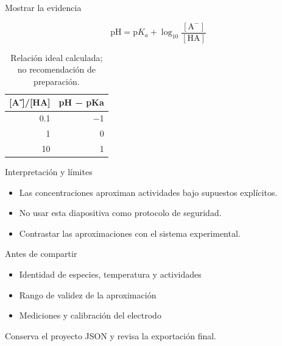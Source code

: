 \documentclass[aspectratio=169,11pt]{beamer}
\begin{document}
\begin{frame}{Mostrar la evidencia}
  \transdissolve[duration=0.25]
  \begin{center}
  \end{center}
  \medskip

  \begin{equation*}
    \mathrm{pH}=\mathrm{p}K_a+\log_{10}\frac{[\mathrm{A}^{-}]}{[\mathrm{HA}]}
  \end{equation*}
  \medskip

  \begin{table}
    \centering
    \caption{Relación ideal calculada; no recomendación de preparación.}
    \begin{tabular}{rr}
      \toprule
      \textbf{[A⁻]/[HA]} & \textbf{pH − pKa} \\
      \midrule
      0.1 & −1 \\
      1 & 0 \\
      10 & 1 \\
      \bottomrule
    \end{tabular}
  \end{table}
\end{frame}

\begin{frame}{Interpretación y límites}
  \transdissolve[duration=0.25]
  \begin{itemize}
    \item Las concentraciones aproximan actividades bajo supuestos explícitos.
    \item No usar esta diapositiva como protocolo de seguridad.
    \item Contrastar las aproximaciones con el sistema experimental.
  \end{itemize}
\end{frame}

\begin{frame}{Antes de compartir}
  \transdissolve[duration=0.25]
  \begin{itemize}
    \item Identidad de especies, temperatura y actividades
    \item Rango de validez de la aproximación
    \item Mediciones y calibración del electrodo
  \end{itemize}
  \medskip

  {\small Conserva el proyecto JSON y revisa la exportación final.}
\end{frame}
\end{document}
